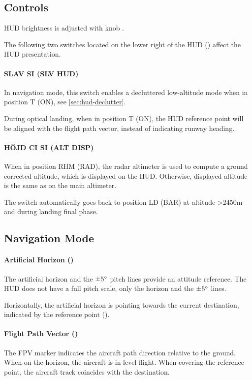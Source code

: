 \subsection{Controls}
HUD brightness is adjusted with knob .

The following two switches located on the lower right of the HUD
() affect the HUD presentation.

\paragraph{SLAV SI (SLV HUD)}
\label{sec:hud-slav-switch}
In navigation mode, this switch enables a decluttered low-altitude mode when
in position T (ON), see \cref{sec:hud-declutter}.

During optical landing, when in position T (ON), the HUD reference point will
be aligned with the flight path vector, instead of indicating runway heading.

\paragraph{HÖJD CI SI (ALT DISP)}
\label{sec:hud-alt-switch}
When in position RHM (RAD), the radar altimeter is used to compute a ground
corrected altitude, which is displayed on the HUD.
Otherwise, displayed altitude is the same as on the main altimeter.

The switch automatically goes back to position LD (BAR) at altitude >2450m
and during landing final phase.

\subsection{Navigation Mode}
\paragraph{Artificial Horizon ()}
The artificial horizon and the $\pm 5 \degree$ pitch lines provide an attitude reference.
The HUD does not have a full pitch scale, only the horizon and the $\pm 5 \degree$ lines.

Horizontally, the artificial horizon is pointing towards the current destination,
indicated by the reference point ().

\paragraph{Flight Path Vector ()}
The FPV marker indicates the aircraft path direction relative to the ground.
When on the horizon, the aircraft is in level flight.
When covering the reference point, the aircraft track coincides with the destination.

